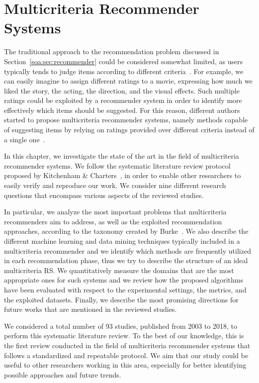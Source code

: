 \chapter{Multicriteria Recommender Systems}
\graphicspath{{Chapter03/Figures/}}
\label{chap:multicriteria}

The traditional approach to the recommendation problem discussed in Section~\ref{soa:sec:recommender} could be considered somewhat limited, as users typically tends to judge items according to different criteria~\cite{Adomavicius2015}. For example, we can easily imagine to assign different ratings to a movie, expressing how much we liked the story, the acting, the direction, and the visual effects. Such multiple ratings could be exploited by a recommender system in order to identify more effectively which items should be suggested. For this reason, different authors started to propose multicriteria recommender systems, namely methods capable of suggesting items by relying on ratings provided over different criteria instead of a single one~\cite{Adomavicius2005,Manouselis2007}.

In this chapter, we investigate the state of the art in the field of multicriteria recommender systems. We follow the systematic literature review protocol proposed by Kitchenham \& Charters~\cite{Kitchenham07}, in order to enable other researchers to easily verify and reproduce our work. We consider nine different research questions that encompass various aspects of the reviewed studies.

In particular, we analyze the most important problems that multicriteria recommenders aim to address, as well as the exploited recommendation approaches, according to the taxonomy created by Burke~\cite{Burke2007}. We also describe the different machine learning and data mining techniques typically included in a multicriteria recommender and we identify which methods are frequently utilized in each recommendation phase, thus we try to describe the structure of an ideal multicriteria RS. We quantitatively measure the domains that are the most appropriate ones for such systems and we review how the proposed algorithms have been evaluated with respect to the experimental settings, the metrics, and the exploited datasets. Finally, we describe the most promising directions for future works that are mentioned in the reviewed studies.

We considered a total number of 93 studies, published from 2003 to 2018, to perform this systematic literature review. To the best of our knowledge, this is the first review conducted in the field of multicriteria recommender systems that follows a standardized and repeatable protocol. We aim that our study could be useful to other researchers working in this area, especially for better identifying possible approaches and future trends.

